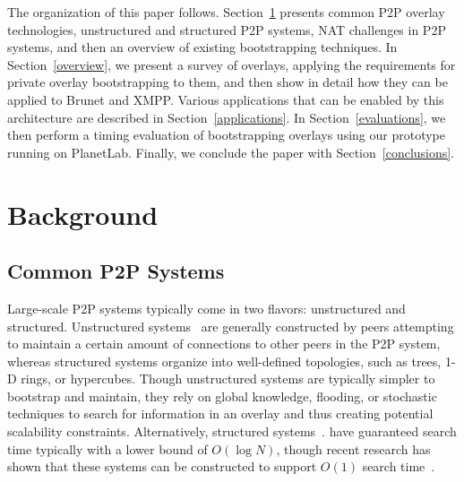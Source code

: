 \documentclass[conference]{IEEEtran}
\begin{document}
The organization of this paper follows.  Section~\ref{background} presents
common P2P overlay technologies, unstructured and structured P2P systems, NAT
challenges in P2P systems, and then an overview of existing bootstrapping
techniques.  In Section~\ref{overview}, we present a survey of overlays,
applying the requirements for private overlay bootstrapping to them, and then
show in detail how they can be applied to Brunet and XMPP.  Various
applications that can be enabled by this architecture are described in
Section~\ref{applications}.  In Section~\ref{evaluations}, we then perform a
timing evaluation of bootstrapping overlays using our prototype running on
PlanetLab.  Finally, we conclude the paper with Section~\ref{conclusions}.

\section{Background}
\label{background}
\subsection{Common P2P Systems}

Large-scale P2P systems typically come in two flavors:  unstructured and
structured.  Unstructured systems~\cite{gnutella, fasttrack} are generally
constructed by peers attempting to maintain a certain amount of connections to
other peers in the P2P system, whereas structured systems organize into
well-defined topologies, such as trees, 1-D rings, or hypercubes.  Though
unstructured systems are typically simpler to bootstrap and maintain, they rely
on global knowledge, flooding, or stochastic techniques to search for
information in an overlay and thus creating potential scalability constraints.
Alternatively, structured systems~\cite{pastry, chord, symphony, kademlia,
can}.  have guaranteed search time typically with a lower bound of $O(\log N)$,
though recent research has shown that these systems can be constructed to
support $O(1)$ search time~\cite{beehive}.  
\end{document}
